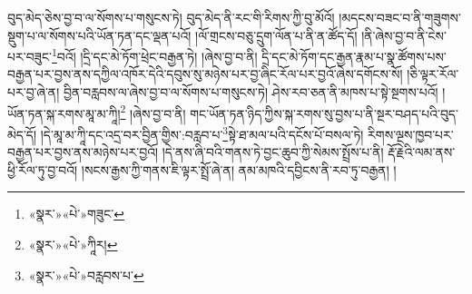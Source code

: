 བུད་མེད་ཅེས་བྱ་བ་ལ་སོགས་པ་གསུངས་ཏེ། བུད་མེད་ནི་རང་གི་རིགས་ཀྱི་བུ་མོའོ། །མདངས་བཟང་བ་ནི་གཟུགས་སྡུག་པ་ལ་སོགས་པའི་ཡོན་ཏན་དང་ལྡན་པའོ། །ལོ་གྲངས་བཅུ་དྲུག་ལོན་པ་ནི་ན་ཚོད་དོ། །ནི་ཞེས་བྱ་བ་ནི་ངེས་པར་བཟུང་\footnote{«སྣར་»«པེ་»གཟུང་}བའོ། །དྲི་དང་མེ་ཏོག་ཕྲེང་བརྒྱན་ཏེ། །ཞེས་བྱ་བ་ནི། དྲི་དང་མེ་ཏོག་དང་རྒྱན་རྣམ་པ་སྣ་ཚོགས་པས་བརྒྱན་པར་བྱས་ནས་དཀྱིལ་འཁོར་དེའི་དབུས་སུ་མཉེས་པར་བྱ་ཞིང་རོལ་པར་བྱའོ་ཞེས་དགོངས་སོ། །ཅི་ལྟར་རོལ་པར་བྱ་ཞེ་ན། བྱིན་བརླབས་ལ་ཞེས་བྱ་བ་ལ་སོགས་པ་གསུངས་ཏེ། ཤེས་རབ་ཅན་ནི་མཁས་པ་སྟེ་སྔགས་པའོ། །ཡོན་ཏན་སྐ་རགས་མཱ་མ་ཀཱི།\footnote{«སྣར་»«པེ་»ཀཱིར།} །ཞེས་བྱ་བ་ནི། གང་ཡོན་ཏན་ཉིད་ཀྱིས་སྐ་རགས་སུ་བྱས་པ་ནི་སྔར་བཤད་པའི་བུད་མེད་དོ། །དེ་མཱ་མ་ཀཱི་དང་འདྲ་བར་བྱིན་གྱིས་:བརླབ་པ་\footnote{«སྣར་»«པེ་»བརླབས་པ་}སྟེ་ཐ་མལ་པའི་དངོས་པོ་བསལ་ཏེ། རིགས་ལྔས་ཁྱབ་པར་བརྒྱན་པར་བྱས་ནས་མཉེས་པར་བྱའོ། །དེ་ནས་ཞི་བའི་གནས་ཏེ་བྱང་ཆུབ་ཀྱི་སེམས་སྤྲོས་པ་ནི། རྡོ་རྗེའི་ལམ་ནས་ཕྱི་རོལ་ཏུ་བྱ་བའོ། །སངས་རྒྱས་ཀྱི་གནས་ཇི་ལྟར་སྤྲོ་ཞེ་ན། ནམ་མཁའི་དབྱིངས་ནི་རབ་ཏུ་བརྒྱན། །
